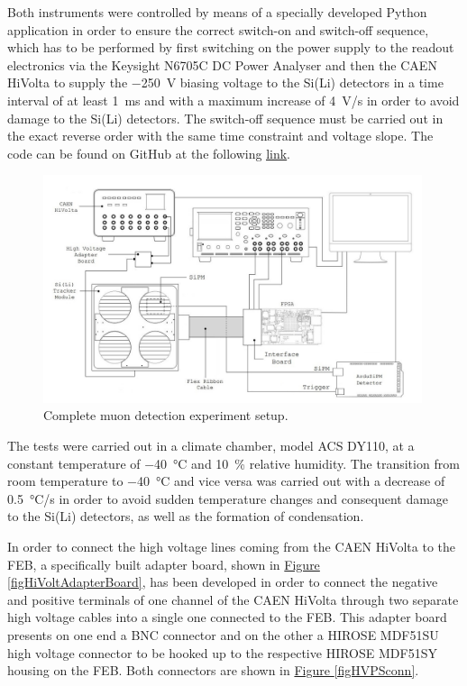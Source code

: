\noindent
Both instruments were controlled by means of a specially developed Python application in order to ensure the correct switch-on and switch-off sequence, which has to be performed by first switching on the power supply to the readout electronics via the Keysight N6705C DC Power Analyser and then the CAEN HiVolta to supply the \SI{-250}{\volt} biasing voltage to the Si(Li) detectors in a time interval of at least \SI{1}{\milli\second} and with a maximum increase of \SI{4}{\volt/\second} in order to avoid damage to the Si(Li) detectors. The switch-off sequence must be carried out in the exact reverse order with the same time constraint and voltage slope. The code can be found on GitHub at the following \href{https://github.com/lucaghislo/GAPS_module_setup}{\underline{link}}.

\begin{figure}[h!]
    \centering
    \includegraphics[width=0.99\textwidth]{Images/chap3/test_setup_MODULE.jpg}
    \caption{Complete muon detection experiment setup.}
    \label{figModuleSetup}
\end{figure}

\par
The tests were carried out in a climate chamber, model ACS DY110, at a constant temperature of \SI{-40}{\celsius} and \SI{10}{\percent} relative humidity. The transition from room temperature to \SI{-40}{\celsius} and vice versa was carried out with a decrease of \SI{0.5}{\celsius/\second} in order to avoid sudden temperature changes and consequent damage to the Si(Li) detectors, as well as the formation of condensation.

\par
In order to connect the high voltage lines coming from the CAEN HiVolta to the FEB, a specifically built adapter board, shown in \hyperref[figHiVoltAdapterBoard]{Figure \ref{figHiVoltAdapterBoard}}, has been developed in order to connect the negative and positive terminals of one channel of the CAEN HiVolta through two separate high voltage cables into a single one connected to the FEB. This adapter board presents on one end a BNC connector and on the other a HIROSE MDF51SU high voltage connector to be hooked up to the respective HIROSE MDF51SY housing on the FEB. Both connectors are shown in \hyperref[figHVPSconn]{Figure \ref{figHVPSconn}}.

